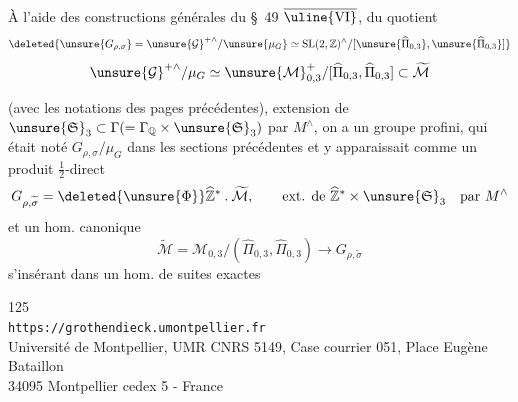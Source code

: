 À l'aide des constructions générales du \S~49 $\overline{\uline{\mathrm{VI}}}$,  du quotient
\[
\deleted{\unsure{G_{\rho,\sigma}}=\unsure{\mathcal G}^{+\wedge}/\unsure{\mu_G}\simeq
\operatorname{SL}(2,\mathbb Z)^\wedge/
[\unsure{\widehat\Pi_{0,3}},\unsure{\widehat\Pi_{0,3}}]}
\]
\[
\unsure{\mathcal G}^{+\wedge}/\mu_G\simeq
\unsure{\mathcal M}_{0,3}^{+}/[\widehat\Pi_{0,3},\widehat\Pi_{0,3}]
\subset\widetilde{\mathcal M}
\]


(avec les notations des pages précédentes), extension de $\unsure{\mathfrak S}_3\subset\Gamma(=\Gamma_{\mathbb Q}\times\unsure{\mathfrak S}_3)$ par $M^\wedge$, on a  un groupe profini,  qui était noté $G_{\rho,\sigma}/\mu_G$  dans les sections précédentes et y apparaissait comme un produit $\frac12$-direct
\[
G_{\rho,\widetilde\sigma}
=\deleted{\unsure{\Phi}}\widehat{\mathbb Z}^{*}\mathbin{.}\widetilde{\mathcal M},
\qquad\text{ext. de }\widehat{\mathbb Z}^{*}\times\unsure{\mathfrak S}_3
\quad\text{par }M^\wedge
\]
et un hom. canonique
\[
\widetilde{\mathcal M}
=\mathcal M_{0,3}/(\widehat\Pi_{0,3},\widehat\Pi_{0,3})
\longrightarrow G_{\rho,\widetilde\sigma}
\]
s'insérant dans un hom. de suites exactes


\begin{center}
\small
125\\
\texttt{https://grothendieck.umontpellier.fr}\\
Université de Montpellier, UMR CNRS 5149, Case courrier 051, Place Eugène Bataillon\\
34095 Montpellier cedex 5 - France
\end{center}


\diagram{
\[
\begin{tikzcd}[column sep=large,row sep=huge]
1 \arrow[r,no head] &
\widehat M \arrow[r] \arrow[d,Rightarrow] &
\widetilde{\mathcal M} \arrow[r] \arrow[d] &
\underbrace{\Gamma}_{N_{0,3}=\Gamma_{\mathbb Q}\times\unsure{\mathfrak S}_3}
\arrow[r,no head] \arrow[d,"\unsure{\chi}\times\operatorname{id}_{\unsure{\mathfrak S}_3}"] & 1 \\
1 \arrow[r,no head] &
\widehat M \arrow[r,no head] &
G_{\rho,\widetilde\sigma} \arrow[r] &
\widehat{\mathbb Z}^{*}\times\unsure{\mathfrak S}_3 \arrow[r,no head] & 1 .
\end{tikzcd}
\tag{282}
\]
}

